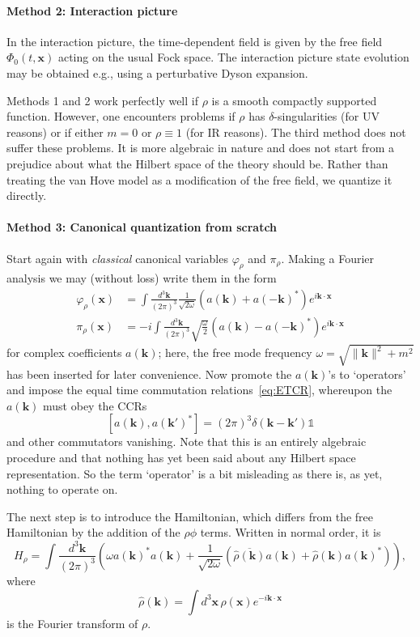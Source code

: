 \documentclass[12pt]{article}
\newcommand{\1}{\mathds{1}}                         %
\newcommand{\kb}{{\boldsymbol{k}}}
\newcommand{\xb}{{\boldsymbol{x}}}
\begin{document}
	\paragraph{Method 2: Interaction picture} In the interaction picture, the time-dependent
	field is given by the free field $\Phi_0(t,\xb)$ acting on the usual Fock space. The interaction picture state evolution may be obtained e.g., using a perturbative Dyson expansion.	
	
	Methods 1 and 2 work perfectly well if $\rho$ is a smooth compactly supported function. However, one encounters problems if $\rho$ has $\delta$-singularities (for UV reasons) or if either $m=0$ or $\rho\equiv 1$ (for IR reasons). The third method does not suffer these problems. It is more algebraic in nature and does not start from a prejudice about what the Hilbert space of the theory should be. Rather than treating the van Hove model as a modification of the free field, we quantize it directly.  
	
	\paragraph{Method 3: Canonical quantization from scratch} Start again
	with \emph{classical} canonical variables $\varphi_\rho$ and $\pi_\rho$. Making a Fourier analysis we may (without loss) write them in the form
	\begin{align*}
	\varphi_\rho(\xb) &= \int\frac{d^3\kb}{(2\pi)^3}\frac{1}{\sqrt{2\omega}}
	(a(\kb) + a(-\kb)^*)e^{i\kb\cdot\xb}\\
	\pi_\rho(\xb) &= -i\int\frac{d^3\kb}{(2\pi)^3}\sqrt{\frac{\omega}{2}}
	(a(\kb) - a(-\kb)^*)e^{i\kb\cdot\xb}
	\end{align*} 
	for complex coefficients $a(\kb)$; here, the free mode frequency $\omega=\sqrt{\|\kb\|^2+m^2}$ has been inserted for later convenience.
	Now promote the $a(\kb)$'s to `operators' and impose the equal time commutation relations~\eqref{eq:ETCR}, whereupon the $a(\kb)$ must obey the CCRs
	\begin{equation}\label{eq:aCCRs}
	[a(\kb),a(\kb')^*]=(2\pi)^3\delta(\kb-\kb')\mathbb{1}
	\end{equation}
	and other commutators vanishing. Note that this is an entirely algebraic procedure and that nothing has yet been said about any Hilbert space representation. So the term `operator' is a bit misleading as there is, as yet, nothing to operate on.  
	
	The next step is to introduce the Hamiltonian, which differs from the free Hamiltonian by the addition of the $\rho\phi$ terms. Written 
	in normal order, it is 
	\begin{equation}\label{eq:HvH}
	H_\rho=\int\frac{d^3\kb}{(2\pi)^3} \left(\omega a(\kb)^*a(\kb) +\frac{1}{\sqrt{2\omega}}\left(\overline{\hat{\rho}(\kb)}a(\kb) + \hat{\rho}(\kb)a(\kb)^*\right) \right) ,
	\end{equation} 
	where 
	\begin{equation}
	\hat{\rho}(\kb)=\int d^3\xb\, \rho(\xb)e^{-i\kb\cdot\xb}
	\end{equation} 
	is the Fourier transform of $\rho$.
	
\end{document}
